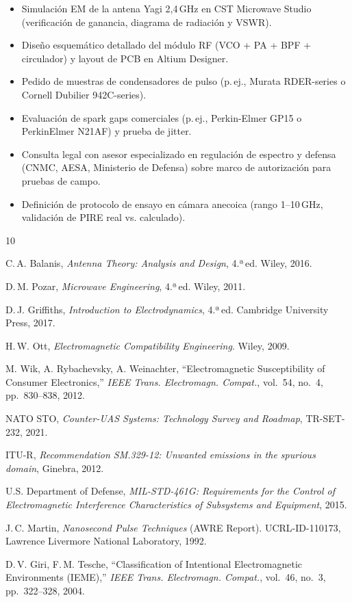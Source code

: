 \documentclass[12pt,a4paper]{article}
\begin{document}
\begin{itemize}[itemsep=3pt]
  \item[$\square$] Simulación EM de la antena Yagi 2,4\,GHz en CST Microwave Studio
        (verificación de ganancia, diagrama de radiación y VSWR).
  \item[$\square$] Diseño esquemático detallado del módulo RF
        (VCO + PA + BPF + circulador) y layout de PCB en Altium Designer.
  \item[$\square$] Pedido de muestras de condensadores de pulso
        (p.\,ej., Murata RDER-series o Cornell Dubilier 942C-series).
  \item[$\square$] Evaluación de spark gaps comerciales (p.\,ej., Perkin-Elmer
        GP15 o PerkinElmer N21AF) y prueba de jitter.
  \item[$\square$] Consulta legal con asesor especializado en regulación
        de espectro y defensa (CNMC, AESA, Ministerio de Defensa) sobre
        marco de autorización para pruebas de campo.
  \item[$\square$] Definición de protocolo de ensayo en cámara anecoica
        (rango 1–10\,GHz, validación de PIRE real vs. calculado).
\end{itemize}

\begin{thebibliography}{10}

  C.\,A. Balanis,
  \textit{Antenna Theory: Analysis and Design}, 4.ª\,ed.
  Wiley, 2016.

  D.\,M. Pozar,
  \textit{Microwave Engineering}, 4.ª\,ed.
  Wiley, 2011.

  D.\,J. Griffiths,
  \textit{Introduction to Electrodynamics}, 4.ª\,ed.
  Cambridge University Press, 2017.

  H.\,W. Ott,
  \textit{Electromagnetic Compatibility Engineering}.
  Wiley, 2009.

  M. Wik, A. Rybachevsky, A. Weinachter,
  ``Electromagnetic Susceptibility of Consumer Electronics,''
  \textit{IEEE Trans. Electromagn. Compat.}, vol.~54, no.~4, pp.~830–838, 2012.

  NATO STO,
  \textit{Counter-UAS Systems: Technology Survey and Roadmap},
  TR-SET-232, 2021.

  ITU-R,
  \textit{Recommendation SM.329-12: Unwanted emissions in the spurious domain},
  Ginebra, 2012.

  U.S. Department of Defense,
  \textit{MIL-STD-461G: Requirements for the Control of Electromagnetic
  Interference Characteristics of Subsystems and Equipment}, 2015.

  J.\,C. Martin,
  \textit{Nanosecond Pulse Techniques} (AWRE Report).
  UCRL-ID-110173, Lawrence Livermore National Laboratory, 1992.

  D.\,V. Giri, F.\,M. Tesche,
  ``Classification of Intentional Electromagnetic Environments (IEME),''
  \textit{IEEE Trans. Electromagn. Compat.}, vol.~46, no.~3, pp.~322–328, 2004.

\end{thebibliography}
\end{document}
